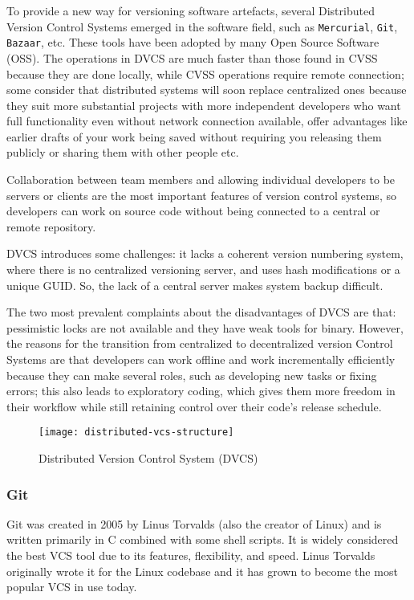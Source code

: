 To provide a new way for versioning software artefacts, several Distributed Version Control Systems emerged in the software field, such as \lstinline{Mercurial}, \lstinline{Git}, \lstinline{Bazaar}, etc. These tools have been adopted by many Open Source Software (OSS). The operations in DVCS are much faster than those found in CVSS because they are done locally, while CVSS operations require remote connection; some consider that distributed systems will soon replace centralized ones because they suit more substantial projects with more independent developers who want full functionality even without network connection available, offer advantages like earlier drafts of your work being saved without requiring you releasing them publicly or sharing them with other people etc.

Collaboration between team members and allowing individual developers to be servers or clients are the most important features of version control systems, so developers can work on source code without being connected to a central or remote repository.

DVCS introduces some challenges: it lacks a coherent version numbering system, where there is no centralized versioning server, and uses hash modifications or a unique GUID. So, the lack of a central server makes system backup difficult.

The two most prevalent complaints about the disadvantages of DVCS are that: pessimistic locks are not available and they have weak tools for binary. However, the reasons for the transition from centralized to decentralized version Control Systems are that developers can work offline and work incrementally efficiently because they can make several roles, such as developing new tasks or fixing errors; this also leads to exploratory coding, which gives them more freedom in their workflow while still retaining control over their code's release schedule.

\begin{figure}[htbp]
    \centering
    \texttt{[image: distributed-vcs-structure]}
    \caption{Distributed Version Control System (DVCS)}
    \label{fig:dvcs-structure}
\end{figure}

\subsubsection{Git}
Git was created in 2005 by Linus Torvalds (also the creator of Linux) and is written primarily in C combined with some shell scripts. It is widely considered the best VCS tool due to its features, flexibility, and speed. Linus Torvalds originally wrote it for the Linux codebase and it has grown to become the most popular VCS in use today.


